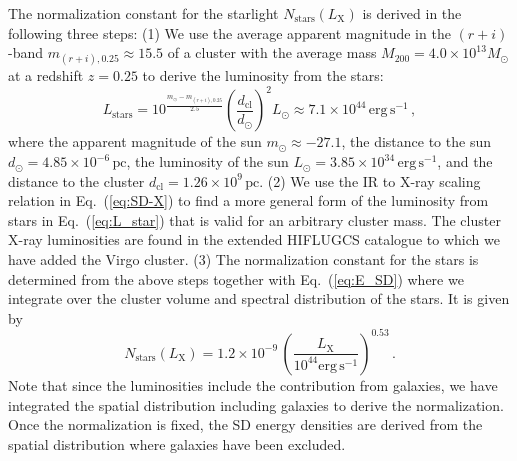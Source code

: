 \documentclass[10pt,aps,pra,reprint,amsmath,amsfonts,amssymb,showpacs]{revtex4-1}
\newcommand{\rmn}{\mathrm}
\newcommand{\clu}{\rmn{cl}}
\newcommand{\msun}{M_\odot}
\newcommand{\stars}{\rmn{stars}}
\newcommand{\lx}{L_\rmn{X}}
\newcommand{\mvir}{M_{200}}
\begin{document}
The normalization constant for the starlight $N_\stars(\lx)$ is derived
in the following three steps: (1) We use the average apparent magnitude
in the $(r+i)$-band $m_{(r+i),0.25}\approx 15.5$
\cite{2005MNRAS.358..949Z} of a cluster with the average mass
$\mvir=4.0\times10^{13}\msun$ at a redshift $z=0.25$ to derive the
luminosity from the stars:
\begin{equation}
L_\stars=10^{\frac{m_\odot-m_{(r+i),0.25}}{2.5}}
\left(\frac{d_\clu}{d_\odot}\right)^2 L_\odot
\approx 7.1\times10^{44}\,\rmn{erg}\,\rmn{s}^{-1}\,,
\label{eq:L_star}
\end{equation}
where the apparent magnitude of the sun $m_\odot\approx -27.1$, the
distance to the sun $d_\odot=4.85\times10^{-6}\,\rmn{pc}$, the
luminosity of the sun $L_\odot=3.85\times10^{34}\,\rmn{erg\,s}^{-1}$,
and the distance to the cluster $d_\clu=1.26\times10^9\,\rmn{pc}$. (2)
We use the IR to X-ray scaling relation in Eq.~(\ref{eq:SD-X}) to find
a more general form of the luminosity from stars in
Eq.~(\ref{eq:L_star}) that is valid for an arbitrary cluster mass. The
cluster X-ray luminosities are found in the extended HIFLUGCS
catalogue \cite{2002ApJ...567..716R} to which we have added the Virgo
cluster. (3) The normalization constant for the stars is
determined from the above steps together with Eq.~(\ref{eq:E_SD})
where we integrate over the cluster volume and spectral distribution
of the stars. It is given by
\begin{equation}
 N_\stars(\lx) = 1.2\times10^{-9}\,
\left(\frac{\lx}{10^{44}\rmn{erg\,s}^{-1}}\right)^{0.53}\,.
\label{eq:N_stars}
\end{equation}
Note that since the luminosities include the contribution from
galaxies, we have integrated the spatial distribution including
galaxies to derive the normalization. Once the normalization is fixed,
the SD energy densities are derived from the spatial distribution
where galaxies have been excluded.
\end{document}
